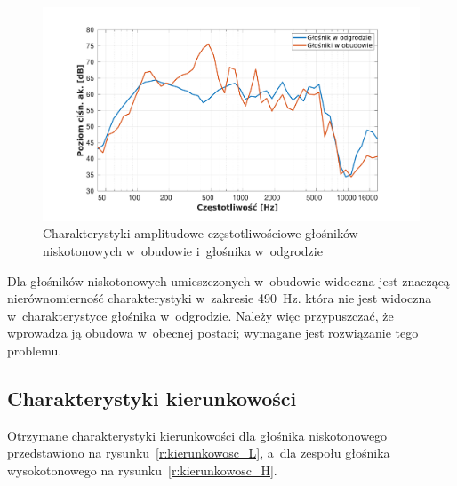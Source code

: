 \documentclass[12pt]{oska}
\begin{document}
	\begin{figure}[!ht]
		\centering
		\includegraphics[width=.8\textwidth,trim={2cm .5cm 2cm 1cm},clip]{stolik_obudowa_odgroda.pdf}
		\caption{Charakterystyki amplitudowe-częstotliwościowe głośników niskotonowych w~obudowie i~głośnika w~odgrodzie}
		\label{r:skutecznosc_odgr}
	\end{figure}
	
	Dla głośników niskotonowych umieszczonych w~obudowie widoczna jest znaczącą nierównomierność charakterystyki w~zakresie \SI{490}{\hertz}. która nie jest widoczna w~charakterystyce głośnika w~odgrodzie. Należy więc przypuszczać, że wprowadza ją obudowa w~obecnej postaci; wymagane jest rozwiązanie tego problemu.
	
	\subsection{Charakterystyki kierunkowości} \label{ss:wyniki_kier}
	
	Otrzymane charakterystyki kierunkowości dla głośnika niskotonowego przedstawiono na rysunku~\ref{r:kierunkowosc_L}, a~dla zespołu głośnika wysokotonowego na rysunku~\ref{r:kierunkowosc_H}. 
	
\end{document}
